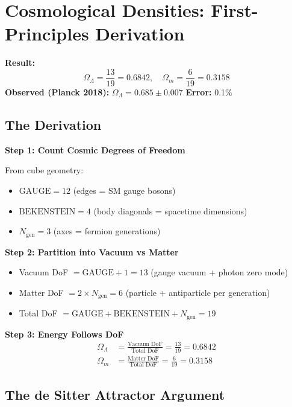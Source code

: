 \documentclass[12pt,a4paper]{article}
\newcommand{\OmegaL}{\Omega_\Lambda}
\newcommand{\OmegaM}{\Omega_m}
\newcommand{\GAUGE}{\text{GAUGE}}
\newcommand{\BEKENSTEIN}{\text{BEKENSTEIN}}
\newcommand{\Ngen}{N_{\text{gen}}}
\begin{document}
\section{Cosmological Densities: First-Principles Derivation}
\label{sec:cosmo}

\begin{derivedbox}
\textbf{Result:}
\begin{equation}
\OmegaL = \frac{13}{19} = 0.6842, \quad \OmegaM = \frac{6}{19} = 0.3158
\end{equation}
\textbf{Observed (Planck 2018):} $\OmegaL = 0.685 \pm 0.007$ \quad \textbf{Error:} 0.1\%
\end{derivedbox}

\subsection{The Derivation}

\textbf{Step 1: Count Cosmic Degrees of Freedom}

From cube geometry:
\begin{itemize}
    \item $\GAUGE = 12$ (edges = SM gauge bosons)
    \item $\BEKENSTEIN = 4$ (body diagonals = spacetime dimensions)
    \item $\Ngen = 3$ (axes = fermion generations)
\end{itemize}

\textbf{Step 2: Partition into Vacuum vs Matter}
\begin{itemize}
    \item Vacuum DoF $= \GAUGE + 1 = 13$ (gauge vacuum + photon zero mode)
    \item Matter DoF $= 2 \times \Ngen = 6$ (particle + antiparticle per generation)
    \item Total DoF $= \GAUGE + \BEKENSTEIN + \Ngen = 19$
\end{itemize}

\textbf{Step 3: Energy Follows DoF}
\begin{align}
\OmegaL &= \frac{\text{Vacuum DoF}}{\text{Total DoF}} = \frac{13}{19} = 0.6842 \\
\OmegaM &= \frac{\text{Matter DoF}}{\text{Total DoF}} = \frac{6}{19} = 0.3158
\end{align}

\subsection{The de Sitter Attractor Argument}
\end{document}
